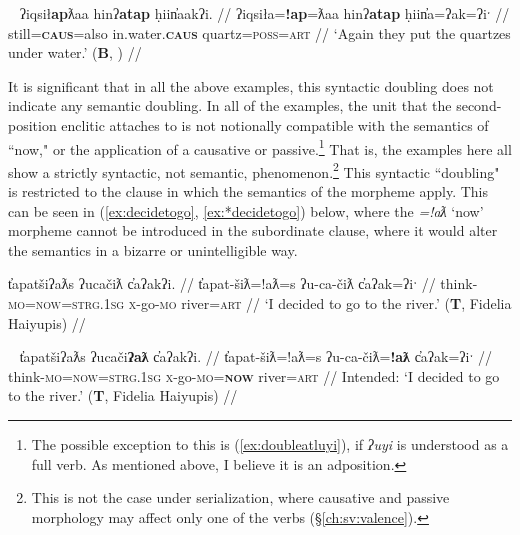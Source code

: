 
\begin{comment}
\ex~ \label{ex:doubleatgeneric}
\begingl
\glpreamble ʔayaqḥʔatna huḥtak̓at. //
\gla ʔaya-(q)ḥ=!at=naˑ huḥtak=!at  //
\glb many-\textsc{link}=\textsc{pass}=\textsc{neut.1pl} learn=\textsc{pass} //
\glft `Many know.' (\textbf{B}, Sarah Webster) //
\endgl
\xe
\end{comment}


\ex~ \label{ex:doubleap}
\begingl
\glpreamble ʔiqsił\textbf{ap}ƛaa hinʔ\textbf{atap} ḥiin̓aakʔi.\footnotemark{} //
\gla ʔiqsiła=\textbf{!ap}=ƛaa hinʔ\textbf{atap} ḥiin̓a=ʔak=ʔiˑ  //
\glb still=\textbf{\textsc{caus}}=also in.water.\textbf{\textsc{caus}} quartz=\textsc{poss}=\textsc{art} //
\glft `Again they put the quartzes under water.' (\textbf{B}, \citealt[p.~60]{sapir1955}) //
\endgl
\xe


It is significant that in all the above examples, this syntactic doubling does not indicate any semantic doubling. In all of the examples, the unit that the second-position enclitic attaches to is not notionally compatible with the semantics of ``now," or the application of a causative or passive.\footnote{The possible exception to this is (\ref{ex:doubleatluyi}), if \textit{ʔuyi} is understood as a full verb. As mentioned above, I believe it is an adposition.} That is, the examples here all show a strictly syntactic, not semantic, phenomenon.\footnote{This is not the case under serialization, where causative and passive morphology may affect only one of the verbs (\S\ref{ch:sv:valence}).} This syntactic ``doubling" is restricted to the clause in which the semantics of the morpheme apply. This can be seen in (\ref{ex:decidetogo}, \ref{ex:*decidetogo}) below, where the \textit{=!aƛ} `now' morpheme cannot be introduced in the subordinate clause, where it would alter the semantics in a bizarre or unintelligible way.

\ex \label{ex:decidetogo}
\begingl
\glpreamble t̓apatšiʔaƛs ʔucačiƛ c̓aʔakʔi. //
\gla t̓apat-šiƛ=!aƛ=s ʔu-ca-čiƛ c̓aʔak=ʔiˑ //
\glb think-\textsc{mo}=\textsc{now}=\textsc{strg.1sg} \textsc{x}-go-\textsc{mo} river=\textsc{art} //
\glft `I decided to go to the river.' (\textbf{T}, Fidelia Haiyupis) //
\endgl
\xe

\ex~ \label{ex:*decidetogo}
\begingl
\glpreamble *t̓apatšiʔaƛs ʔucači\textbf{ʔaƛ} c̓aʔakʔi. //
\gla *t̓apat-šiƛ=!aƛ=s ʔu-ca-čiƛ=\textbf{!aƛ} c̓aʔak=ʔiˑ //
\glb think-\textsc{mo}=\textsc{now}=\textsc{strg.1sg} \textsc{x}-go-\textsc{mo}=\textbf{\textsc{now}} river=\textsc{art} //
\glft Intended: `I decided to go to the river.' (\textbf{T}, Fidelia Haiyupis) //
\endgl
\xe

